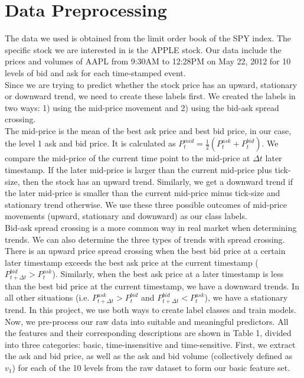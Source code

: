 \documentclass[11pt]{article}
\begin{document}
\section{Data Preprocessing}
The data we used is obtained from the limit order book of the SPY index. The specific stock we are interested in is the APPLE stock. Our data include the prices and volumes of AAPL from 9:30AM to 12:28PM on May 22, 2012 for 10 levels of bid and ask for each time-stamped event. \\
Since we are trying to predict whether the stock price has an upward, stationary or downward trend, we need to create these labels first. We created the labels in two ways: 1) using the mid-price movement and 2) using the bid-ask spread crossing. \\
The mid-price is the mean of the best ask price and best bid price, in our case, the level 1 ask and bid price. It is calculated as $P_t^{mid} = \frac{1}{2}(P_t^{ask} + P_t^{bid})$. We compare the mid-price of the current time point to the mid-price at $\Delta t$ later timestamp. If the later mid-price is larger than the current mid-price plus tick-size, then the stock has an upward trend. Similarly, we get a downward trend if the later mid-price is smaller than the current mid-price minus tick-size and stationary trend otherwise. We use these three possible outcomes of mid-price movements (upward, stationary and downward) as our class labels. \\
Bid-ask spread crossing is a more common way in real market when determining trends. We can also determine the three types of trends with spread crossing. There is an upward price spread crossing when the best bid price at a certain later timestamp exceeds the best ask price at the current timestamp ($P_{t+\Delta t}^{bid} > P_t^{ask}$). Similarly, when the best ask price at a later timestamp is less than the best bid price at the current timestamp, we have a downward trends. In all other situations (i.e. $P^{ask}_{t+\Delta t} > P^{bid}_t$ and $P^{bid}_{t+\Delta t} < P^{ask}_t$), we have a stationary trend. In this project, we use both ways to create label classes and train models. \\
Now, we pre-process our raw data into suitable and meaningful predictors. All the features and their corresponding descriptions are shown in Table 1, divided into three categories: basic, time-insensitive and time-sensitive. First, we extract the ask and bid price, as well as the ask and bid volume (collectively defined as $v_1$) for each of the 10 levels from the raw dataset to form our basic feature set. \\
\end{document}
